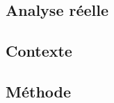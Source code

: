 \documentclass[11pt,a4paper]{article}
\begin{document}
\begin{center}  
\section*{Analyse réelle} 
\end{center}



\subsection*{Contexte}

\subsection*{Méthode}
\end{document}
